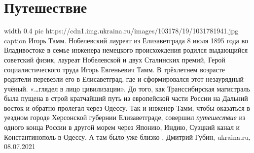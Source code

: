  
 
 
 
 
\chapter{Путешествие}

\ifcmt
	width 0.4
  pic https://cdn1.img.ukraina.ru/images/103178/19/1031781941.jpg
	caption Игорь Тамм. Нобелевский лауреат из Елизаветграда
\fi
8 июля 1895 года во Владивостоке в семье инженера немецкого происхождения
родился выдающийся советский физик, лауреат Нобелевской и двух Сталинских
премий, Герой социалистического труда Игорь Евгеньевич Тамм. В трёхлетнем
возрасте родители перевезли его в Елисаветград, где и сформировался этот
незаурядный учёный.  «…глядел в лицо цивилизации».  До того, как Транссибирская
магистраль была пущена в строй кратчайший путь из европейской части России на
Дальний восток и обратно пролегал через Одессу. Так и инженер Тамм, чтобы
оказаться в уездном городе Херсонской губернии Елизаветграде, совершил
\emph{путешествие} из одного конца России в другой морем через Японию, Индию,
Суэцкий канал и Константинополь в Одессу. А там было уже близко
, Дмитрий Губин, ukraina.ru, 08.07.2021

